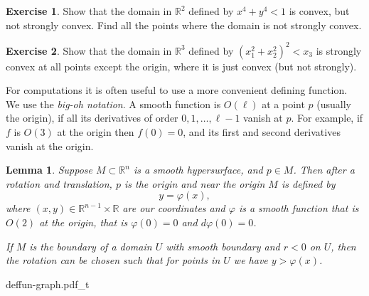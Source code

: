 \documentclass[12pt,openany]{book}
\newcommand{\R}{{\mathbb{R}}}
\newcommand{\myindex}[1]{#1\index{#1}}
\theoremstyle{plain}
\newtheorem{lemma}[thm]{Lemma}
\theoremstyle{remark}
\theoremstyle{definition}
\newenvironment{exbox}{%
    \def\FrameCommand{\vrule width 1pt \relax\hspace {10pt}}%
    \MakeFramed {\advance \hsize -\width \FrameRestore }%
}{%
    \endMakeFramed
}
\theoremstyle{exercise}
\newtheorem{exercise}{Exercise}[section]
\theoremstyle{example}
\begin{document}
\begin{exbox}
\begin{exercise}
Show that the domain in $\R^2$ defined by $x^4+y^4 < 1$ is convex, but not strongly convex.
Find all the points where the domain is not strongly convex.
\end{exercise}

\begin{exercise}
Show that the domain in $\R^3$ defined by ${(x_1^2+x_2^2)}^2 < x_3$ is
strongly convex at all points except the origin, where it is just convex
(but not strongly).
\end{exercise}
\end{exbox}

For computations it is often useful to use a more convenient
defining function.
%
We use the \emph{\myindex{big-oh notation}}.
A smooth function is $O(\ell)$ at a point $p$ (usually the origin),
if all its derivatives of order $0, 1, \ldots,  \ell-1$ vanish at $p$.
For example, if $f$ is $O(3)$ at the origin
then $f(0)=0$, and its first and second derivatives vanish at the origin.

\begin{lemma} \label{lemma:realgraphcoords}
Suppose $M \subset \R^n$ is a smooth hypersurface, %
and $p \in M$.  Then after a rotation and translation, 
$p$ is the origin and near the origin $M$ is defined by
\begin{equation*}
y = \varphi(x) ,
\end{equation*}
where $(x,y) \in \R^{n-1} \times \R$ are our coordinates and
$\varphi$ is a smooth %
function that is $O(2)$ at the origin,
that is $\varphi(0) = 0$ and $d\varphi(0) = 0$.

If $M$ is the boundary of a domain $U$ with smooth boundary and
$r < 0$ on $U$,
then the rotation can be chosen
such that for points in $U$ we have $y > \varphi(x)$.
\end{lemma}


\begin{center}
{deffun-graph.pdf_t}
\end{center}

\end{document}
